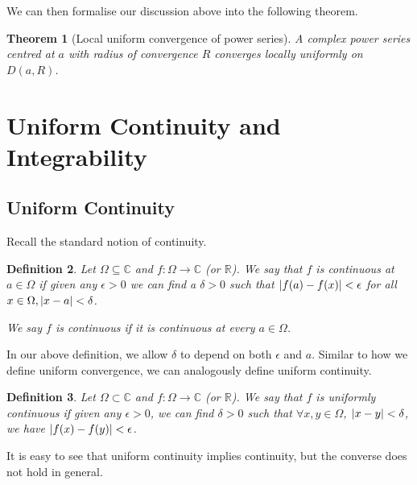 \documentclass{article}
\theoremstyle{plain}\theoremheaderfont{\normalfont\itshape}\theorembodyfont{\rmfamily}\theoremseparator{.}\newtheorem*{rem}{Remark}\newtheorem*{ex}{Example}\newtheorem*{proof}{Proof}\newtheorem*{altp}{Alternative proof}
\theoremstyle{plain}\theoremheaderfont{\normalfont\bfseries}\theorembodyfont{\rmfamily}\theoremseparator{.}\newtheorem{thm}{Theorem}[section]\newtheorem{lem}[thm]{Lemma}\newtheorem{prop}[thm]{Proposition}\newtheorem*{cor}{Corollary}\newtheorem{defn}[thm]{Definition}\newtheorem{clm}[thm]{Claim}\newtheorem{clminproof}{Claim}
\theoremstyle{break}\theoremheaderfont{\normalfont\itshape}\theorembodyfont{\rmfamily}\theoremseparator{.\medskip}\newtheorem*{proofskip}{Proof}\newtheorem*{exs}{Examples}\newtheorem*{rems}{Remarks}
\theoremstyle{break}\theoremheaderfont{\normalfont\bfseries}\theorembodyfont{\rmfamily}\theoremseparator{.\medskip}\newtheorem{lemskip}[thm]{Lemma}\newtheorem{defnskip}[thm]{Definition}\newtheorem{propskip}[thm]{Proposition}\newtheorem{thmskip}[thm]{Theorem}
\begin{document}
    We can then formalise our discussion above into the following theorem.

    \begin{thm}[Local uniform convergence of power series]
        A complex power series centred at \(a\) with radius of convergence \(R\) converges locally uniformly on \(D(a,R)\).        
    \end{thm}

    \newpage
    \section{Uniform Continuity and Integrability}
    \subsection{Uniform Continuity}
    Recall the standard notion of continuity.
    \begin{defn}
        Let \(\Omega\subseteq\mathbb{C}\) and \(f:\Omega\to\mathbb{C}\) (or \(\mathbb{R}\)). We say that \(f\) is \textit{continuous} at \(a\in\Omega\) if given any \(\epsilon>0\) we can find a \(\delta>0\) such that \(\abs{f(a)-f(x)}<\epsilon\) for all \(x\in\Omega, \abs{x-a}<\delta\).

        We say \(f\) is \textit{continuous} if it is continuous at every \(a\in\Omega\).
    \end{defn}

    In our above definition, we allow \(\delta\) to depend on both \(\epsilon\) and \(a\). Similar to how we define uniform convergence, we can analogously define uniform continuity.

    \begin{defn}
        Let \(\Omega\subset\mathbb{C}\) and \(f:\Omega\to\mathbb{C}\) (or \(\mathbb{R}\)). We say that \(f\) is \textit{uniformly continuous} if given any \(\epsilon>0\), we can find \(\delta>0\) such that \(\forall x,y\in\Omega\), \(\abs{x-y}<\delta\), we have \(\abs{f(x)-f(y)}<\epsilon\).
    \end{defn}

    It is easy to see that uniform continuity implies continuity, but the converse does not hold in general.
\end{document}
